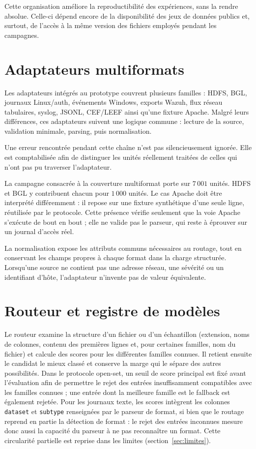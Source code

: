 Cette organisation améliore la reproductibilité des expériences, sans la rendre absolue. Celle-ci dépend encore de la disponibilité des jeux de données publics et, surtout, de l'accès à la même version des fichiers employés pendant les campagnes.


\section{Adaptateurs multiformats}

Les adaptateurs intégrés au prototype couvrent plusieurs familles : HDFS, BGL, journaux Linux/auth, événements Windows, exports Wazuh, flux réseau tabulaires, syslog, JSONL, CEF/LEEF ainsi qu'une fixture Apache. Malgré leurs différences, ces adaptateurs suivent une logique commune : lecture de la source, validation minimale, parsing, puis normalisation.

Une erreur rencontrée pendant cette chaîne n'est pas silencieusement ignorée. Elle est comptabilisée afin de distinguer les unités réellement traitées de celles qui n'ont pas pu traverser l'adaptateur.

La campagne consacrée à la couverture multiformat porte sur $7\,001$ unités. HDFS et BGL y contribuent chacun pour $1\,000$ unités. Le cas Apache doit être interprété différemment : il repose sur une fixture synthétique d'une seule ligne, réutilisée par le protocole. Cette présence vérifie seulement que la voie Apache s'exécute de bout en bout ; elle ne valide pas le parseur, qui reste à éprouver sur un journal d'accès réel.

La normalisation expose les attributs communs nécessaires au routage, tout en conservant les champs propres à chaque format dans la charge structurée. Lorsqu'une source ne contient pas une adresse réseau, une sévérité ou un identifiant d'hôte, l'adaptateur n'invente pas de valeur équivalente.


\section{Routeur et registre de modèles}

Le routeur examine la structure d'un fichier ou d'un échantillon (extension, noms de colonnes, contenu des premières lignes et, pour certaines familles, nom du fichier) et calcule des scores pour les différentes familles connues. Il retient ensuite le candidat le mieux classé et conserve la marge qui le sépare des autres possibilités. Dans le protocole open-set, un seuil de score principal est fixé avant l'évaluation afin de permettre le rejet des entrées insuffisamment compatibles avec les familles connues ; une entrée dont la meilleure famille est le fallback est également rejetée. Pour les journaux texte, les scores intègrent les colonnes \texttt{dataset} et \texttt{subtype} renseignées par le parseur de format, si bien que le routage reprend en partie la détection de format : le rejet des entrées inconnues mesure donc aussi la capacité du parseur à ne pas reconnaître un format. Cette circularité partielle est reprise dans les limites (section~\ref{sec:limites}).

